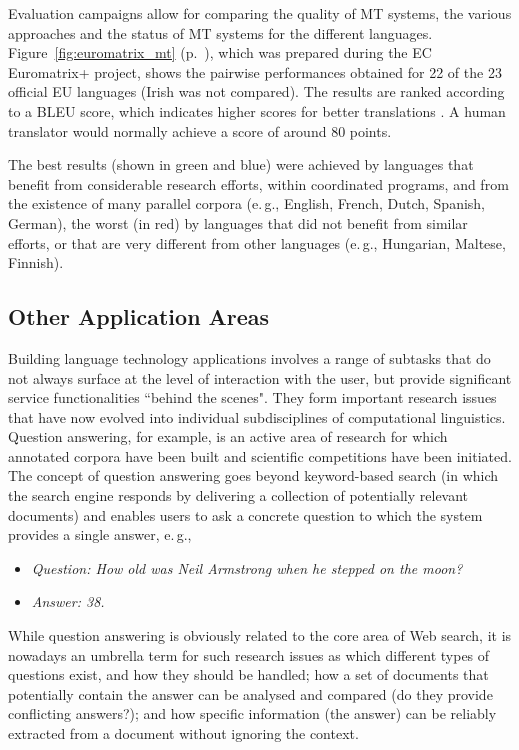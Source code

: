 \begin{multicols}{2}
Evaluation campaigns allow for comparing the quality of MT systems, the various approaches and the status of MT systems for the different languages. Figure~\ref{fig:euromatrix_mt} (p.~\pageref{fig:euromatrix_mt}), which was prepared during the EC Euromatrix+ project, shows the pairwise performances obtained for 22 of the 23 official EU languages (Irish was not compared). The results are ranked according to a BLEU score, which indicates higher scores for better translations \cite{bleu1}. A human translator would normally achieve a score of around 80 points.

The best results (shown in green and blue) were achieved by languages that benefit from considerable research efforts, within coordinated programs, and from the existence of many parallel corpora (e.\,g., English, French, Dutch, Spanish, German), the worst (in red) by languages that did not benefit from similar efforts, or that are very different from other languages (e.\,g., Hungarian, Maltese, Finnish).

\subsection{Other Application Areas}

Building language technology applications involves a range of subtasks that do not always surface at the level of interaction with the user, but provide significant service functionalities ``behind the scenes". They form important research issues that have now evolved into individual subdisciplines of computational linguistics. Question answering, for example, is an active area of research for which annotated corpora have been built and scientific competitions have been initiated. The concept of question answering goes beyond keyword-based search (in which the search engine responds by delivering a collection of potentially relevant documents) and enables users to ask a concrete question to which the system provides a single answer, e.\,g.,

\begin{itemize}
\item[] \textit{Question: How old was Neil Armstrong when he stepped on the moon?}
\item[] \textit{Answer: 38.}
\end{itemize}

While question answering is obviously related to the core area of Web search, it is nowadays an umbrella term for such research issues as which different types of questions exist, and how they should be handled; how a set of documents that potentially contain the answer can be analysed and compared (do they provide conflicting answers?); and how specific information (the answer) can be reliably extracted from a document without ignoring the context. 


\end{multicols}
